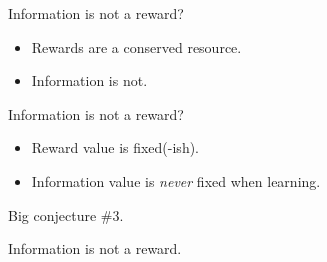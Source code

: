 \documentclass[10pt]{beamer}
\begin{document}
\begin{frame}[fragile]{Information is not a reward?}
\begin{itemize}
    \item Rewards are a conserved resource.
    \item Information is not.
\end{itemize}
\end{frame}

\begin{frame}[fragile]{Information is not a reward?}
\begin{itemize}
    \item Reward value is fixed(-ish).
    \item Information value is \textit{never} fixed when learning.
\end{itemize}
\end{frame}

\begin{frame}[fragile]{Big conjecture \#3.}
\begin{center}
    Information is not a reward.
\end{center}
\end{frame}
\end{document}
